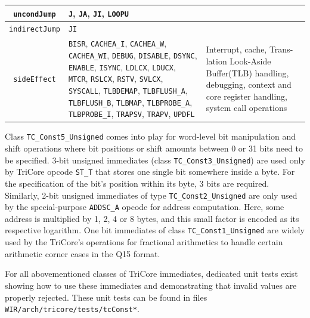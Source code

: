 \begin{table}[t]
\begin{center}
\begin{tabular}{|c|p{79mm}|p{42mm}|}
      \hline
      \texttt{uncondJump} & \texttt{J}, \texttt{JA}, \texttt{JI}, \texttt{LOOPU} & \\
      \hline
      \texttt{indirectJump} & \texttt{JI} & \\
      \hline
      \texttt{sideEffect} & \texttt{BISR}, \texttt{CACHEA\_I}, \texttt{CACHEA\_W}, \texttt{CACHEA\_WI}, \texttt{DEBUG}, \texttt{DISABLE}, \texttt{DSYNC}, \texttt{ENABLE}, \texttt{ISYNC}, \texttt{LDLCX}, \texttt{LDUCX}, \texttt{MTCR}, \texttt{RSLCX}, \texttt{RSTV}, \texttt{SVLCX}, \texttt{SYSCALL}, \texttt{TLBDEMAP}, \texttt{TLBFLUSH\_A}, \texttt{TLBFLUSH\_B}, \texttt{TLBMAP}, \texttt{TLBPROBE\_A}, \texttt{TLBPROBE\_I}, \texttt{TRAPSV}, \texttt{TRAPV}, \texttt{UPDFL} & Interrupt, cache, Trans-\newline lation Look-Aside Buffer\newline (TLB) handling, debugging, context and core register handling, system call operations \\
      \hline
    \end{tabular}
  \end{center}
\end{table}

Class \texttt{TC\_Const5\_Unsigned} comes into play for word-level bit manipulation and shift operations where bit positions or shift amounts between 0 or 31 bits need to be specified.
3-bit unsigned immediates (class \texttt{TC\_Const3\_\-Unsigned}) are used only by TriCore opcode \texttt{ST\_T} that stores one single bit somewhere inside a byte.
For the specification of the bit's position within its byte, 3 bits are required.
Similarly, 2-bit unsigned immediates of type \texttt{TC\_Const2\_Unsigned} are only used by the special-purpose \texttt{ADDSC\_A} opcode for address computation.
Here, some address is multiplied by 1, 2, 4 or 8 bytes, and this small factor is encoded as its respective logarithm.
One bit immediates of class \texttt{TC\_Const1\_Unsigned} are widely used by the TriCore's operations for fractional arithmetics to handle certain arithmetic corner cases in the Q15 format.

For all abovementioned classes of TriCore immediates, dedicated unit tests exist showing how to use these immediates and demonstrating that invalid values are properly rejected.
These unit tests can be found in files \texttt{WIR/arch/tricore/tests/tcConst*}.

